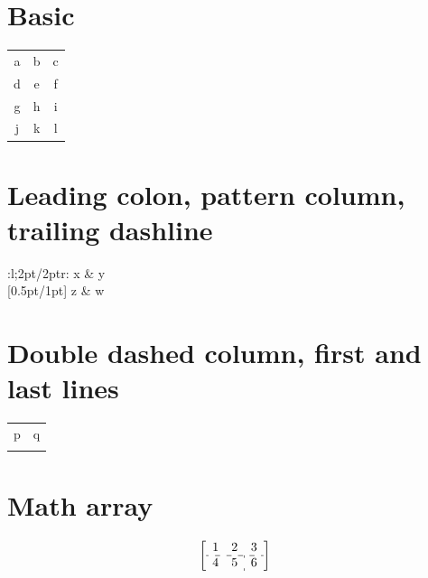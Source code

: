 \documentclass{article}
\begin{document}
\section{Basic}
\begin{tabular}{c:c|c}
\hline
a & b & c \\ \hdashline
d & e & f \\ 
g & h & i \\ \hdashline[1pt/2pt]
j & k & l \\ \hline
\end{tabular}

\section{Leading colon, pattern column, trailing dashline}
\setlength{\dashlinedash}{1pt}\setlength{\dashlinegap}{2pt}
\begin{tabular}{:l;{2pt/2pt}r:}
\hdashline
x & y \\ [0.5pt/1pt]
z & w \\
\hdashline
\end{tabular}

\section{Double dashed column, first and last lines}
\ADLnullwide\ADLinactivate\ADLactivate
\begin{tabular}{c::c}
\firsthdashline
p & q \\
\lasthdashline
\end{tabular}

\section{Math array}
\[ \left[\begin{array}{cc:c} 1 & 2 & 3\\ \hdashline 4 & 5 & 6 \end{array}\right] \]
\end{document}
